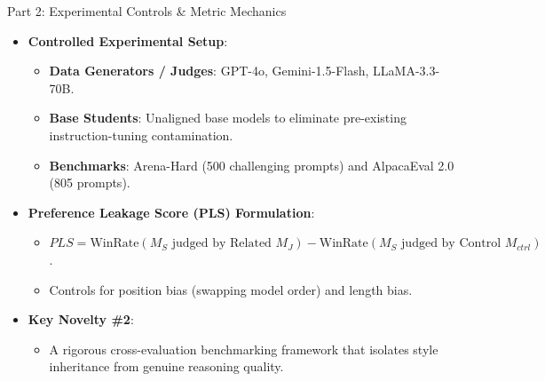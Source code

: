 \documentclass[10pt]{beamer}
\begin{document}
	\begin{frame}{Part 2: Experimental Controls \& Metric Mechanics}
		\begin{itemize}
			\item \textbf{Controlled Experimental Setup}:
			\begin{itemize}
				\item \textbf{Data Generators / Judges}: GPT-4o, Gemini-1.5-Flash, LLaMA-3.3-70B.
				\item \textbf{Base Students}: Unaligned base models to eliminate pre-existing instruction-tuning contamination.
				\item \textbf{Benchmarks}: Arena-Hard (500 challenging prompts) and AlpacaEval 2.0 (805 prompts).
			\end{itemize}
			\vspace{0.2cm}
			\item \textbf{Preference Leakage Score (PLS) Formulation}:
			\begin{itemize}
				\item $PLS = \text{WinRate}(M_S \text{ judged by Related } M_J) - \text{WinRate}(M_S \text{ judged by Control } M_{ctrl})$.
				\item Controls for position bias (swapping model order) and length bias.
			\end{itemize}
			\vspace{0.2cm}
			\item \textbf{Key Novelty \#2}:
			\begin{itemize}
				\item A rigorous cross-evaluation benchmarking framework that isolates style inheritance from genuine reasoning quality.
			\end{itemize}
		\end{itemize}
	\end{frame}
	
\end{document}
